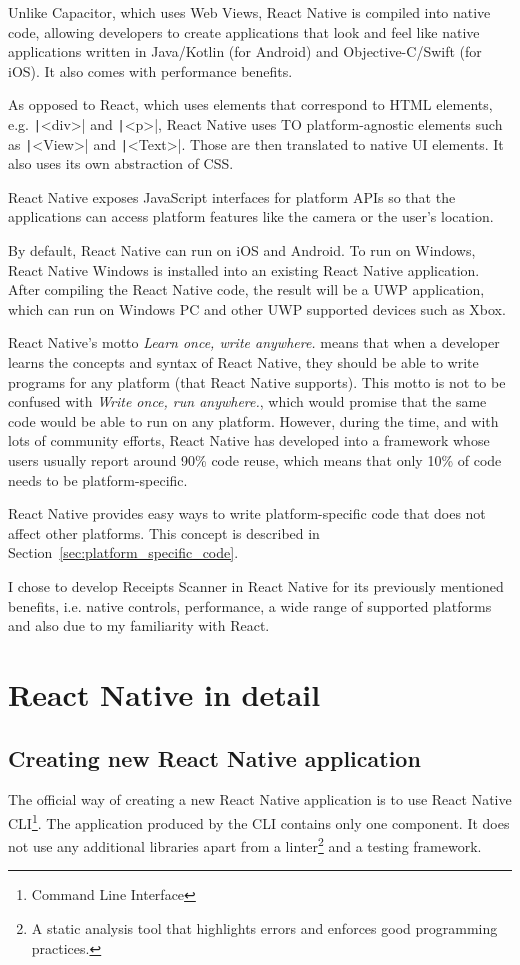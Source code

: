 \documentclass[
  printed, %
  table,   %
  oneside, %
  lof,     %
  lot,     %
]{fithesis3}
\newcommand{\code}[1]{\texttt|#1|} %
\begin{document}
Unlike Capacitor, which uses Web Views, React Native is compiled into native code, allowing developers to create applications that look and feel like native applications written in Java/Kotlin (for Android) and Objective-C/Swift (for iOS). It also comes with performance benefits. 

As opposed to React, which uses elements that correspond to HTML elements, e.g. \code{<div>} and \code{<p>}, React Native uses TO platform-agnostic elements such as \code{<View>} and \code{<Text>}. Those are then translated to native UI elements. It also uses its own abstraction of CSS.

React Native exposes JavaScript interfaces for platform APIs so that the applications can access platform features like the camera or the user’s location.

By default, React Native can run on iOS and Android. To run on Windows, React Native Windows is installed into an existing React Native application. After compiling the React Native code, the result will be a UWP application, which can run on Windows PC and other UWP supported devices such as Xbox.

React Native's motto \textit{Learn once, write anywhere.} means that when a developer learns the concepts and syntax of React Native, they should be able to write programs for any platform (that React Native supports). This motto is not to be confused with \textit{Write once, run anywhere.}, which would promise that the same code would be able to run on any platform. However, during the time, and with lots of community efforts, React Native has developed into a framework whose users usually report around 90\% code reuse, which means that only 10\% of code needs to be platform-specific. 

React Native provides easy ways to write platform-specific code that does not affect other platforms. This concept is described in Section~\ref{sec:platform_specific_code}.

I chose to develop Receipts Scanner in React Native for its previously mentioned benefits, i.e. native controls, performance, a wide range of supported platforms and also due to my familiarity with React.

\chapter{React Native in detail}

\section{Creating new React Native application}
The official way of creating a new React Native application is to use React Native CLI\footnote{Command Line Interface}. The application produced by the CLI contains only one component. It does not use any additional libraries apart from a linter\footnote{A static analysis tool that highlights errors and enforces good programming practices.} and a testing framework.
\end{document}
